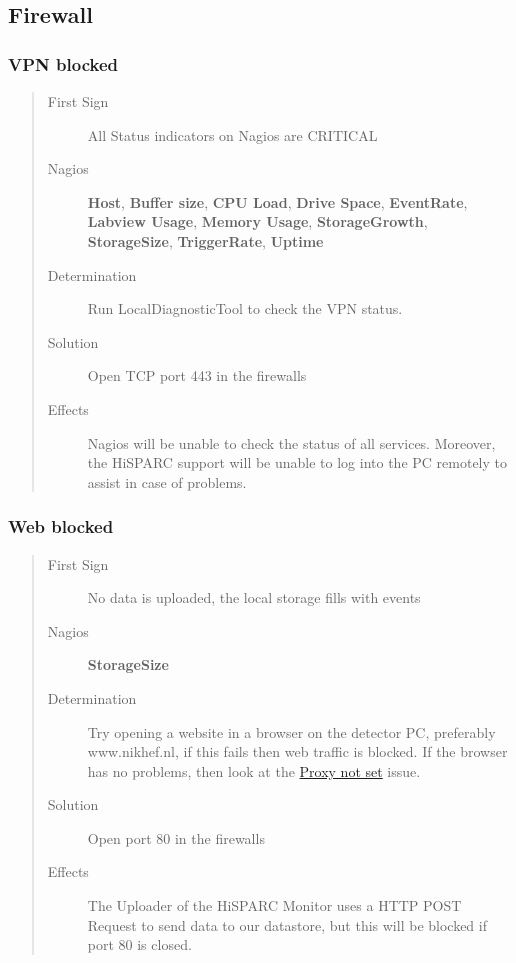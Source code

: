 \documentclass[a4paper,11pt,english]{sphinxmanual}
\begin{document}
\subsection{Firewall}
\label{known-issues:firewall}

\subsubsection{VPN blocked}
\label{known-issues:vpn-blocked}\begin{quote}\begin{description}
\item[{First Sign}] \leavevmode
All Status indicators on Nagios are CRITICAL

\item[{Nagios}] \leavevmode
\textbf{Host}, \textbf{Buffer size}, \textbf{CPU Load}, \textbf{Drive Space}, \textbf{EventRate}, \textbf{Labview Usage}, \textbf{Memory Usage}, \textbf{StorageGrowth}, \textbf{StorageSize}, \textbf{TriggerRate}, \textbf{Uptime}

\item[{Determination}] \leavevmode
Run LocalDiagnosticTool to check the VPN status.

\item[{Solution}] \leavevmode
Open TCP port 443 in the firewalls

\item[{Effects}] \leavevmode
Nagios will be unable to check the status of all services. Moreover, the HiSPARC support will be unable to log into the PC remotely to assist in case of problems.

\end{description}\end{quote}


\subsubsection{Web blocked}
\label{known-issues:web-blocked}\begin{quote}\begin{description}
\item[{First Sign}] \leavevmode
No data is uploaded, the local storage fills with events

\item[{Nagios}] \leavevmode
\textbf{StorageSize}

\item[{Determination}] \leavevmode
Try opening a website in a browser on the detector PC, preferably www.nikhef.nl, if this fails then web traffic is blocked. If the browser has no problems, then look at the {\hyperref[known-issues:proxy-not-set]{Proxy not set}} issue.

\item[{Solution}] \leavevmode
Open port 80 in the firewalls

\item[{Effects}] \leavevmode
The Uploader of the HiSPARC Monitor uses a HTTP POST Request to send data to our datastore, but this will be blocked if port 80 is closed.

\end{description}\end{quote}
\end{document}
